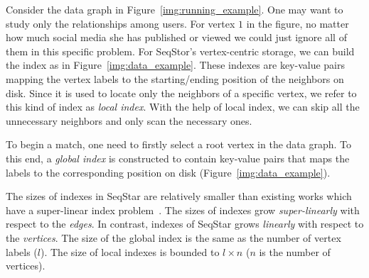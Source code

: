 Consider the data graph in Figure~\ref{img:running_example}.
One may want to study only the relationships among users.
For vertex $1$ in the figure,
no matter how much social media she has published or viewed we could just ignore all of them in this specific problem.
For SeqStor's vertex-centric storage,
we can build the index as in Figure~\ref{img:data_example}.
These indexes are key-value pairs mapping the vertex labels to the starting/ending position of the neighbors on disk.
Since it is used to locate only the neighbors of a specific vertex, we refer to this kind of index as \emph{local index}.
With the help of local index, we can skip all the unnecessary neighbors and only scan the necessary ones.


To begin a match, one need to firstly select a root vertex in the data graph.
To this end, a \emph{global index} is constructed to contain key-value pairs that maps the labels to the corresponding position on disk (Figure~\ref{img:data_example}).

The sizes of indexes in SeqStar are relatively smaller than existing works which have a super-linear index problem~\cite{DBLP:journals/pvldb/SunWWSL12}. The sizes of indexes grow \emph{super-linearly} with respect to the \emph{edges}.
In contrast, indexes of SeqStar grows \emph{linearly} with respect to the \emph{vertices}.
The size of the global index is the same as the number of vertex labels ($l$). The size of local indexes is bounded to $l \times n$ ($n$ is the number of vertices).
